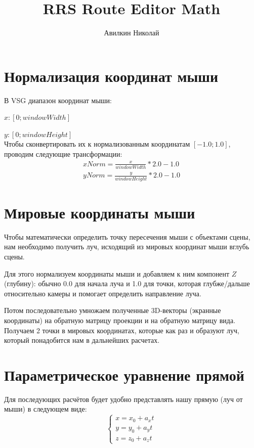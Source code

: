 \documentclass{article}
\title{RRS Route Editor Math}
\author{Авилкин Николай}
\begin{document}
	\maketitle
	\newpage
	\tableofcontents
	\newpage
	\section{Нормализация координат мыши}
	В VSG диапазон координат мыши:
	
	$x:[0;windowWidth]$
	
	$y:[0;windowHeight]$\\
	
	Чтобы сконвертировать их к нормализованным координатам $[-1.0;1.0]$, проводим
	следующие трансформации:
	\begin{equation}
		\begin{split}
			xNorm=\frac{x}{windowWidth}*2.0-1.0\\
			yNorm=\frac{y}{windowHeight}*2.0-1.0
		\end{split}
	\end{equation}
	\section{Мировые координаты мыши}
	Чтобы математически определить точку пересечения мыши с объектами сцены, нам
	необходимо получить луч, исходящий из мировых координат мыши вглубь сцены.
	
	Для этого нормализуем координаты мыши и добавляем к ним компонент $Z$ (глубину):
	обычно 0.0 для начала луча и 1.0 для точки, которая глубже/дальше относительно
	камеры и помогает определить направление луча.
	
	Потом последовательно умножаем полученные 3D-векторы (экранные координаты) на
	обратную матрицу проекции и на обратную матрицу вида. Получаем 2 точки в мировых
	координатах, которые как раз и образуют луч, который понадобится нам в
	дальнейших расчетах.
	\section{Параметрическое уравнение прямой}
	Для последующих расчётов будет удобно представлять нашу прямую (луч от мыши) в
	следующем виде:
	\begin{equation}
		\begin{cases}
			x=x_0+a_xt\\
			y=y_0+a_yt\\
			z=z_0+a_zt
		\end{cases}
	\end{equation}
	
\end{document}
